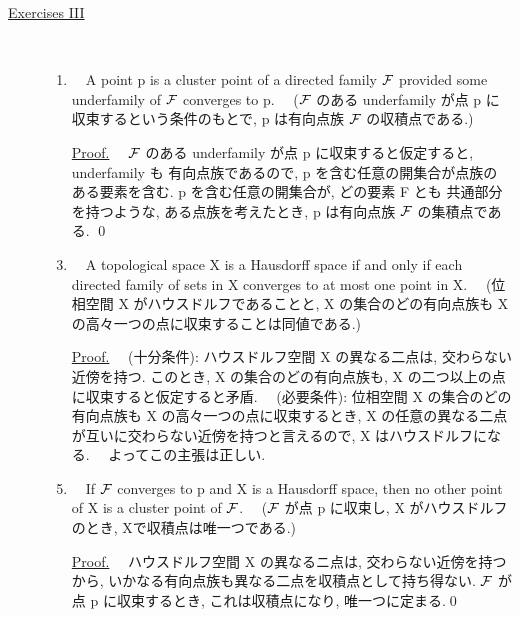 \documentclass{msjproc}
\begin{document}
	\begin{description}
		\item[\underline{Exercises I\hspace{-.1em}I\hspace{-.1em}I}]
			　
			\begin{enumerate}\renewcommand{\labelenumi}{\arabic{enumi}.}
				
				\item
				　A point p is a cluster point of a directed family $\cal{F}$ 
				provided some underfamily of $\cal{F}$ converges to p.
				\newline
				　($\cal{F}$ のある underfamily が点 p に収束するという条件のもとで, 
				p は有向点族 $\cal{F}$ の収積点である.)
				\item[\underline{Proof.}]
				　$\cal{F}$ のある underfamily が点 p に収束すると仮定すると, 
				underfamily も 有向点族であるので, p を含む任意の開集合が点族の
				ある要素を含む. p を含む任意の開集合が, どの要素 F とも
				共通部分を持つような, ある点族を考えたとき, 
				p は有向点族 $\cal{F}$ の集積点である.  \qed

				\item
				　A topological space X is a Hausdorff space if and only if 
				each directed family of sets in X converges to at most one 
				point in X.
				\newline
				　(位相空間 X がハウスドルフであることと, X の集合のどの有向点族も
				X の高々一つの点に収束することは同値である.)
				\item[\underline{Proof.}]
				　(十分条件):
				ハウスドルフ空間 X の異なる二点は, 交わらない近傍を持つ.
				このとき, X の集合のどの有向点族も, 
				X の二つ以上の点に収束すると仮定すると矛盾.
				　(必要条件):
				位相空間 X の集合のどの有向点族も X の高々一つの点に収束するとき, 
				X の任意の異なる二点が互いに交わらない近傍を持つと言えるので, 
				X はハウスドルフになる.
				\newline
				　よってこの主張は正しい.

				\item
				　If $\cal{F}$ converges to p and X is a Hausdorff space, 
				then no other point of X is a cluster point of $\cal{F}$.
				\newline
				　($\cal{F}$ が点 p に収束し, X がハウスドルフのとき, 
				Xで収積点は唯一つである.)
				\item[\underline{Proof.}]
				　ハウスドルフ空間 X の異なるニ点は, 交わらない近傍を持つから, 
				いかなる有向点族も異なる二点を収積点として持ち得ない. 
				$\cal{F}$ が点 p に収束するとき, これは収積点になり, 唯一つに定まる.\qed
			\end{enumerate}
	\end{description}
\end{document}
